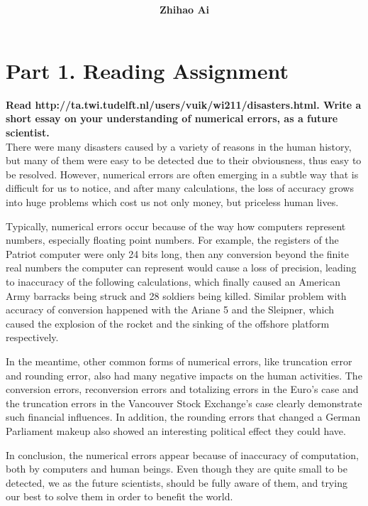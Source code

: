 \documentclass[10pt]{report}
\title{
	\vspace{2in}
	\textmd{\textbf{\hwCourse\\\hwTitle}}\\
	\vspace{0.3in}\large{\textit{\hmwkClassInstructor}}
	\vspace{3in}
}
\author{\textbf{Zhihao Ai}}
\date{}
\begin{document}
\maketitle

\section*{Part 1. Reading Assignment}
\textbf{Read http://ta.twi.tudelft.nl/users/vuik/wi211/disasters.html. Write a short essay on your understanding of numerical errors, as a future scientist.}
\\
There were many disasters caused by a variety of reasons in the human history, but many of them were easy to be detected due to their obviousness, thus easy to be resolved. However, numerical errors are often emerging in a subtle way that is difficult for us to notice, and after many calculations, the loss of accuracy grows into huge problems which cost us not only money, but priceless human lives.

Typically, numerical errors occur because of the way how computers represent numbers, especially floating point numbers. For example, the registers of the Patriot computer were only 24 bits long, then any conversion beyond the finite real numbers the computer can represent would cause a loss of precision, leading to inaccuracy of the following calculations, which finally caused an American Army barracks being struck and 28 soldiers being killed. Similar problem with accuracy of conversion happened with the Ariane 5 and the Sleipner, which caused the explosion of the rocket and the sinking of the offshore platform respectively.

In the meantime, other common forms of numerical errors, like truncation error and rounding error, also had many negative impacts on the human activities. The conversion errors, reconversion errors and totalizing errors in the Euro’s case and the truncation errors in the Vancouver Stock Exchange’s case clearly demonstrate such financial influences. In addition, the rounding errors that changed a German Parliament makeup also showed an interesting political effect they could have.

In conclusion, the numerical errors appear because of inaccuracy of computation, both by computers and human beings. Even though they are quite small to be detected, we as the future scientists, should be fully aware of them, and trying our best to solve them in order to benefit the world.
\end{document}
